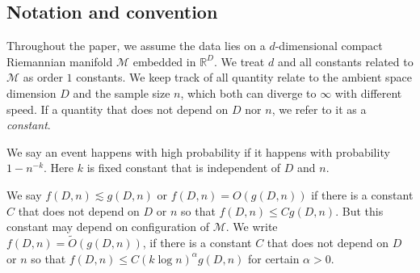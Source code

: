 \documentclass{article}
\def\calM{\mathcal{M}}
\begin{document}
\subsection{Notation and convention}
Throughout the paper, we assume the data lies on a $d$-dimensional compact Riemannian manifold $\calM$ embedded in $\mathbb{R}^D$. We treat $d$ and all constants related to $\calM$ as order $1$ constants. We keep track of all quantity relate to the ambient space dimension $D$ and the sample size $n$, which both can diverge to $\infty$ with different speed. If a quantity that does not depend on $D$ nor $n$, we refer to it as a \emph{constant}. 

We say an event happens with high probability if it happens with probability $1-n^{-k}$. Here $k$ is fixed constant that is independent of $D$ and $n$.

We say $f(D,n)\lesssim g(D,n)$ or $f(D,n)=O(g(D,n))$ if there is a constant $C$ that does not depend on $D$ or $n$ so that $f(D,n)\leq Cg(D,n)$. But this constant may depend on configuration of $\calM$. We write $f(D,n)=\widetilde{O}(g(D,n))$, if there is a constant $C$ that does not depend on $D$ or $n$ so that $f(D,n)\leq C(k\log n )^{\alpha}g(D,n)$  for certain $\alpha>0$. 
\end{document}
